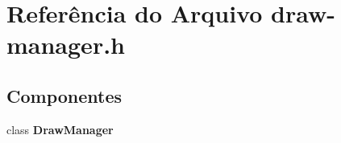 \section{Referência do Arquivo draw-\/manager.h}
\label{draw-manager_8h}
\subsection*{Componentes}
\begin{DoxyCompactItemize}
\item 
class {\bf Draw\+Manager}
\end{DoxyCompactItemize}
